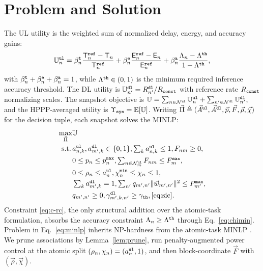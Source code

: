 \documentclass[journal]{IEEEtran}
\begin{document}
\section{Problem and Solution}
\label{sec:sol}
{The UL utility is the weighted sum of normalized delay, energy, and accuracy gains:}
\begin{equation}
\mathbb{U}_n^{\tt ul}
=\beta_n^{\tt t}\frac{\mathsf{T}_n^{\tt ref}-\mathsf{T}_n}{\mathsf{T}_n^{\tt ref}}
+\beta_n^{\tt e}\frac{\mathsf{E}_n^{\tt ref}-\mathsf{E}_n}{\mathsf{E}_n^{\tt ref}}
+\beta_n^{\tt a}\frac{\Lambda_n-\Lambda^{\tt th}}{1-\Lambda^{\tt th}},
\label{eq:Uul}
\end{equation}
with $\beta_n^{\tt t}+\beta_n^{\tt e}+\beta_n^{\tt a}=1$, while {$\Lambda^{\tt th} \in (0, 1)$ is the minimum required inference accuracy threshold.}
The DL utility is $\mathbb{U}_{n'}^{\tt dl}=R_{n'}^{\tt dl}/R_{\tt const}$ with reference rate $R_{\tt const}$ normalizing scales. The snapshot objective is $\mathbb{U}=\sum_{n\in\mathcal{N}^{\tt ul}}\mathbb{U}_n^{\tt ul}+\sum_{n'\in\mathcal{N}^{\tt dl}}\mathbb{U}_{n'}^{\tt dl}$, and the HPPP-averaged utility is $\Upsilon_{\tt sys}=\mathbb{E}[\mathbb{U}]$.
Writing $\vec{\Pi}\triangleq(\vec{A}^{\tt ul},\vec{A}^{\tt dl},\vec{p},\vec{F},\vec{\rho},\vec{\chi})$ for the decision tuple, each snapshot solves the MINLP:
\begin{subequations}\label{eq:minlp}
\begin{align}
\max_{\vec{\Pi}}&\mathbb{U}\\
\mathrm{s.t.}\,&a_{n,k}^{\tt ul},a_{m',k}^{\tt dl}\in\{0,1\},\textstyle\sum_k a_{n,k}^{\tt ul}\le1,F_{nm}\ge0,\label{eq:c-a}\\
&0\le p_n\le p_n^{\tt max},\textstyle\sum_{n\in\mathcal{N}_m^{\tt ul}}F_{nm}\le F_m^{\tt max},\label{eq:c-pf}\\
&0\le\rho_n\le a_n^{\tt ul},\chi_n^{\tt min}\le\chi_n\le1,\label{eq:c-rc}\\
&\textstyle\sum_k a_{m',k}^{\tt dl}=1,\textstyle\sum_{n'}q_{m',n'}\Vert\vec{w}_{m',n'}\Vert^2\le P_{m'}^{\tt max},\label{eq:c-dl}\\
&{q_{m',n'} \ge 0}, \gamma_{m',k,n'}^{\tt dl}\ge\gamma_{\tt th},\eqref{eq:sic}. \label{eq:c-sic}
\end{align}
\end{subequations}
Constraint \eqref{eq:c-rc}, the only structural addition over the atomic-task formulation, absorbs the accuracy constraint $\Lambda_n\ge\Lambda^{\tt th}$ through Eq.~\eqref{eq:chimin}. Problem in Eq.~\eqref{eq:minlp} inherits NP-hardness from the atomic-task MINLP \cite{Hoang_TCOM_2024}. We prune associations by Lemma~\ref{lem:prune}, run penalty-augmented power control at the atomic split $(\rho_n,\chi_n)=(a_n^{\tt ul},1)$, and then block-coordinate $\vec{F}$ with $(\vec{\rho},\vec{\chi})$.
\end{document}
